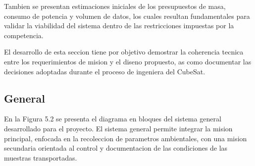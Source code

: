 Tambien se presentan estimaciones iniciales de los presupuestos de masa, consumo de
potencia y volumen de datos, los cuales resultan fundamentales para validar la viabilidad del
sistema dentro de las restricciones impuestas por la competencia.

El desarrollo de esta seccion tiene por objetivo demostrar la coherencia tecnica entre los
requerimientos de mision y el diseno propuesto, as como documentar las decisiones adoptadas
durante el proceso de ingeniera del CubeSat.

  \subsection{General}
    En la Figura 5.2 se presenta el diagrama en bloques del sistema general desarrollado para
    el proyecto. El sistema general permite integrar la mision principal, enfocada en la recoleccion
    de parametros ambientales, con una mision secundaria orientada al control y documentacion de
    las condiciones de las muestras transportadas.

